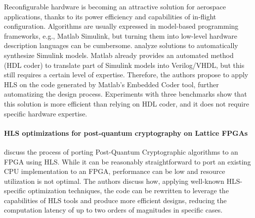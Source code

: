 Reconfigurable hardware is becoming an attractive solution for aerospace applications, thanks to its power efficiency and capabilities of in-flight configuration. Algorithms are usually expressed in model-based programming frameworks, e.g., Matlab Simulink, but turning them into low-level hardware description languages can be cumbersome. \citet{Curzel2023ExplorationApplications} analyze solutions to automatically synthesize Simulink models. Matlab already provides an automated method (HDL coder) to translate part of Simulink models into Verilog/VHDL, but this still requires a certain level of expertise. Therefore, the authors propose to apply HLS on the code generated by Matlab's Embedded Coder tool, further automatizing the design process. Experiments with three %
benchmarks show that this solution is more efficient than relying on HDL coder, and it does not require specific hardware expertise. %

\paragraph{HLS optimizations for  post-quantum cryptography on Lattice FPGAs}

\citet{Guerrieri2022OptimizingSynthesis} discuss the process of porting Post-Quantum Cryptographic algorithms to an FPGA using HLS. While it can be reasonably straightforward %
to port an existing CPU implementation to an FPGA, %
performance can be low and resource utilization %
is not optimal. The authors discuss how, applying well-known HLS-specific optimization techniques, the code can be rewritten to leverage the capabilities of HLS tools and produce more efficient designs, reducing the computation latency of up to two orders of magnitudes in specific cases.


